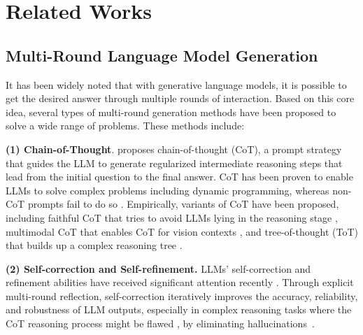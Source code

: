 
\section{Related Works}
\label{section2}


\subsection{Multi-Round Language Model Generation}
It has been widely noted that with generative language models, it is possible to get the desired answer through multiple rounds of interaction. Based on this core idea, several types of multi-round generation methods have been proposed to solve a wide range of problems. These methods include: 


\textbf{(1) Chain-of-Thought}. \citet{wei2022chain} proposes chain-of-thought (CoT), a prompt strategy that guides the LLM to generate regularized intermediate reasoning steps that lead from the initial question to the final answer. CoT has been proven to enable LLM{\color{black}s} to solve complex problems including dynamic programming, whereas non-CoT prompts fail to do so \citep{feng2023towards}. Empirically, variants of CoT have been proposed, including faithful CoT that tries to avoid LLMs lying in the reasoning stage \citep{lyu2023faithfulchainofthoughtreasoning}, multimodal CoT that enables CoT for vision context{\color{black}s} \citep{zhang2024multimodalchainofthoughtreasoninglanguage}, and tree-of-thought (ToT) that builds up a complex reasoning tree \citep{yao2023treethoughtsdeliberateproblem}.

\textbf{(2) Self-correction and Self-refinement.} LLMs' self-correction and refinement abilities have received significant attention recently \citep{madaan2024self, shinn2023reflexion, kim2023language}. Through explicit multi-round reflection, self-correction iteratively improves the accuracy, reliability, and robustness of LLM outputs, especially in complex reasoning tasks where the CoT reasoning process might be flawed \citep{madaan2024self}, by eliminating hallucinations~\citep{liu2024intrinsicselfcorrectioncapabilityllms}. %


